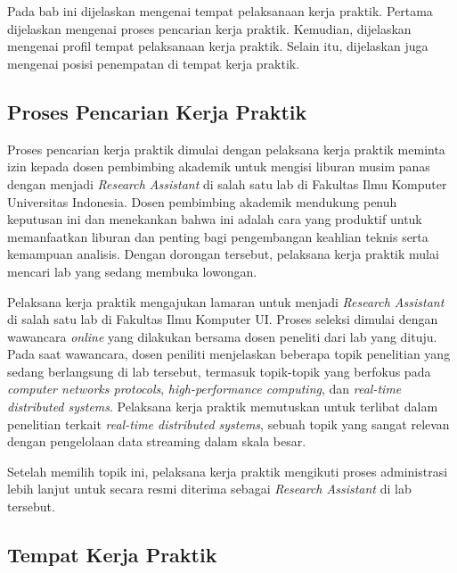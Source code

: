 \chapter{\babSatu}
\label{bab:1}

Pada bab ini dijelaskan mengenai tempat pelaksanaan kerja praktik. Pertama dijelaskan mengenai proses pencarian kerja praktik. Kemudian, dijelaskan mengenai profil tempat pelaksanaan kerja praktik. Selain itu, dijelaskan juga mengenai posisi penempatan di tempat kerja praktik.

\section{Proses Pencarian Kerja Praktik}

Proses pencarian kerja praktik dimulai dengan pelaksana kerja praktik meminta izin kepada dosen pembimbing akademik untuk mengisi liburan musim panas dengan menjadi \textit{Research Assistant} di salah satu lab di Fakultas Ilmu Komputer Universitas Indonesia. Dosen pembimbing akademik mendukung penuh keputusan ini dan menekankan bahwa ini adalah cara yang produktif untuk memanfaatkan liburan dan penting bagi pengembangan keahlian teknis serta kemampuan analisis. Dengan dorongan tersebut, pelaksana kerja praktik mulai mencari lab yang sedang membuka lowongan.

Pelaksana kerja praktik mengajukan lamaran untuk menjadi \textit{Research Assistant} di salah satu lab di Fakultas Ilmu Komputer UI. Proses seleksi dimulai dengan wawancara \textit{online} yang dilakukan bersama dosen peneliti dari lab yang dituju. Pada saat wawancara, dosen peniliti menjelaskan beberapa topik penelitian yang sedang berlangsung di lab tersebut, termasuk topik-topik yang berfokus pada \textit{computer networks protocols}, \textit{high-performance computing}, dan \textit{real-time distributed systems}. Pelaksana kerja praktik memutuskan untuk terlibat dalam penelitian terkait \textit{real-time distributed systems}, sebuah topik yang sangat relevan dengan pengelolaan data streaming dalam skala besar.

Setelah memilih topik ini, pelaksana kerja praktik mengikuti proses administrasi lebih lanjut untuk secara resmi diterima sebagai \textit{Research Assistant} di lab tersebut.

\section{Tempat Kerja Praktik}

